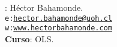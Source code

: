 \documentclass[10pt]{article}
\begin{document}


\thispagestyle{fancy} %





\hspace{-5mm}{\bf Profesor}: H\'ector Bahamonde.\\
\texttt{e:}\href{mailto:hector.bahamonde@uoh.cl}{\texttt{hector.bahamonde@uoh.cl}}\\
\texttt{w:}\href{http://www.hectorbahamonde.com}{\texttt{www.hectorbahamonde.com}}\\
{\bf Curso}: OLS.
\end{document}
